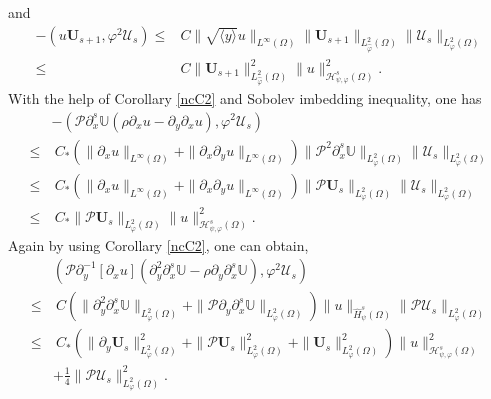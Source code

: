 \documentclass{amsart}
\numberwithin{equation}{section}
\newcommand\y{{{\langle y \rangle}}}
\begin{document}
and
\begin{align}\label{I62}
-(u\mathbf{U}_{s+1},\varphi^{2}\mathcal{U}_{s})
\leq& C\|\sqrt{\y}u\|_{L^{\infty}(\Omega)}
      \|\mathbf{U}_{s+1}\|_{L_{\hat{\varphi}}^{2}(\Omega)}
      \|\mathcal{U}_{s}\|_{L_{\varphi}^{2}(\Omega)}\\
\leq& C\|\mathbf{U}_{s+1}\|_{L_{\hat{\varphi}}^{2}(\Omega)}^{2}
       \|u\|_{\mathcal{H}_{\psi,\varphi}^{s}(\Omega)}^{2}.\nonumber
\end{align}
With the help of Corollary \ref{ncC2} and Sobolev imbedding inequality, one has
\begin{align}\label{I63}
&-(\mathcal{P}\partial_{x}^{s}\mathbb{U}(\rho\partial_{x}u-\partial_{y}\partial_{x}u),\varphi^{2}\mathcal{U}_{s})\\
\leq&~C_{*}\left(\|\partial_{x}u\|_{L^{\infty}(\Omega)}+\|\partial_{x}\partial_{y}u\|_{L^{\infty}(\Omega)}\right)
      \|\mathcal{P}^{2}\partial_{x}^{s}\mathbb{U}\|_{L_{\varphi}^{2}(\Omega)}
      \|\mathcal{U}_{s}\|_{L_{\varphi}^{2}(\Omega)}\nonumber\\
\leq&~C_{*}\left(\|\partial_{x}u\|_{L^{\infty}(\Omega)}+\|\partial_{x}\partial_{y}u\|_{L^{\infty}(\Omega)}\right)
       \|\mathcal{P}\mathbf{U}_{s}\|_{L_{\varphi}^{2}(\Omega)}
       \|\mathcal{U}_{s}\|_{L_{\varphi}^{2}(\Omega)}\nonumber\\
\leq&~C_{*}\|\mathcal{P}\mathbf{U}_{s}\|_{L_{\varphi}^{2}(\Omega)}\|u\|_{\mathcal{H}_{\psi,\varphi}^{s}(\Omega)}^{2}.\nonumber
\end{align}
Again by using Corollary \ref{ncC2}, one can obtain,
\begin{align}\label{I64'}
&(\mathcal{P}\partial_{y}^{-1}[\partial_{x}u](\partial_{y}^{2}\partial_{x}^{s}\mathbb{U}-\rho\partial_{y}\partial_{x}^{s}\mathbb{U}),\varphi^{2}\mathcal{U}_{s})\\
\leq&~C\left(\|\partial_{y}^{2}\partial_{x}^{s}\mathbb{U}\|_{L_{\varphi}^{2}(\Omega)}+\|\mathcal{P}\partial_{y}\partial_{x}^{s}\mathbb{U}\|_{L_{\varphi}^{2}(\Omega)}\right)
       \|u\|_{\hat{H}_{\psi}^{s}(\Omega)}\|\mathcal{P}\mathcal{U}_{s}\|_{L_{\varphi}^{2}(\Omega)}\nonumber\\
\leq&~C_{*}(\|\partial_{y}\mathbf{U}_{s}\|_{L_{\varphi}^{2}(\Omega)}^{2}
        +\|\mathcal{P}\mathbf{U}_{s}\|_{L_{\varphi}^{2}(\Omega)}^{2}
        +\|\mathbf{U}_{s}\|_{L_{\varphi}^{2}(\Omega)}^{2})
       \|u\|_{\mathcal{H}_{\psi,\varphi}^{s}(\Omega)}^{2}\nonumber\\
    &+\frac{1}{4}\|\mathcal{P}\mathcal{U}_{s}\|_{L_{\varphi}^{2}(\Omega)}^{2}.\nonumber
\end{align}
\end{document}
